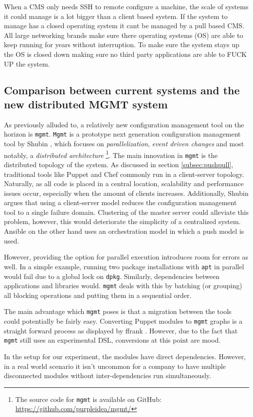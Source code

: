 When a CMS only needs SSH to remote configure a machine, the scale of systems it could manage is a lot bigger than a client based system. If the system to manage has a closed operating system it cant be managed by a pull based CMS. All large networking brands make sure there operating systems (OS) are able to keep running for years without interruption. To make sure the system stays up the OS is closed down making sure no third party applications are able to FUCK UP the system. 

\subsection{Comparison between current systems and the new distributed MGMT system}\label{subsec:distributedmgmt}
As previously alluded to, a relatively new configuration management tool on the horizon is \texttt{mgmt}. \texttt{Mgmt} is a prototype next generation configuration management tool by Shubin \cite{shubin2016}, which focuses on \textit{parallelization}, \textit{event driven changes} and most notably, a \textit{distributed architecture} \footnote{The source code for \texttt{mgmt} is available on GitHub: \url{https://github.com/purpleidea/mgmt/}}. The main innovation in \texttt{mgmt} is the distributed topology of the system. As discussed in section \ref{subsec:pushpull}, traditional tools like Puppet and Chef commonly run in a client-server topology. Naturally, as all code is placed in a central location, scalability and performance issues occur, especially when the amount of clients increases. Additionally, Shubin argues that using a client-server model reduces the configuration management tool to a single failure domain. Clustering of the master server could alleviate this problem, however, this would deteriorate the simplicity of a centralized system. Ansible on the other hand uses an orchestration model in which a push model is used.
 
However, providing the option for parallel execution introduces room for errors as well. In a simple example, running two package installations with \texttt{apt} in parallel would fail due to a global lock on \texttt{dpkg}. Similarly, dependencies between applications and libraries would. \texttt{mgmt} deals with this by batching (or grouping) all blocking operations and putting them in a sequential order. 

The main advantage which \texttt{mgmt} poses is that a migration between the tools could potentially be fairly easy. Converting Puppet modules to \texttt{mgmt} graphs is a straight forward process as displayed by ffrank \cite{}. However, due to the fact that \texttt{mgmt} still uses an experimental DSL, conversions at this point are mood. 


In the setup for our experiment, the modules have direct dependencies. However, in a real world scenario it isn't uncommon for a company to have multiple disconnected modules without inter-dependencies run simultaneously. 
